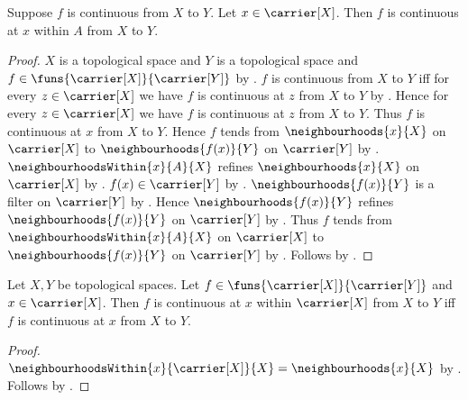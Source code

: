 \begin{theorem}\label{continuous_implies_continuous_at_within}
    Suppose $f$ is continuous from $X$ to $Y$.
    Let $x\in\carrier[X]$.
    Then $f$ is continuous at $x$ within $A$ from $X$ to $Y$.
\end{theorem}
\begin{proof}
    $X$ is a topological space and $Y$ is a topological space and
        $f\in\funs{\carrier[X]}{\carrier[Y]}$ by
        .
    $f$ is continuous from $X$ to $Y$ iff
        for every $z\in\carrier[X]$ we have
        $f$ is continuous at $z$ from $X$ to $Y$ by
        .
    Hence for every $z\in\carrier[X]$ we have
        $f$ is continuous at $z$ from $X$ to $Y$.
    Thus $f$ is continuous at $x$ from $X$ to $Y$.
    Hence $f$ tends from $\neighbourhoods{x}{X}$ on $\carrier[X]$ to
        $\neighbourhoods{f(x)}{Y}$ on $\carrier[Y]$ by
        .
    $\neighbourhoodsWithin{x}{A}{X}$ refines
        $\neighbourhoods{x}{X}$ on $\carrier[X]$ by
        .
    $f(x)\in\carrier[Y]$ by .
    $\neighbourhoods{f(x)}{Y}$ is a filter on $\carrier[Y]$ by
        .
    Hence $\neighbourhoods{f(x)}{Y}$ refines
        $\neighbourhoods{f(x)}{Y}$ on $\carrier[Y]$ by
        .
    Thus $f$ tends from $\neighbourhoodsWithin{x}{A}{X}$ on
        $\carrier[X]$ to $\neighbourhoods{f(x)}{Y}$ on $\carrier[Y]$ by
        .
    Follows by .
\end{proof}

\begin{theorem}\label{continuous_at_within_carrier_iff}
    Let $X,Y$ be topological spaces.
    Let $f\in\funs{\carrier[X]}{\carrier[Y]}$ and
        $x\in\carrier[X]$.
    Then $f$ is continuous at $x$ within $\carrier[X]$ from $X$ to $Y$
        iff $f$ is continuous at $x$ from $X$ to $Y$.
\end{theorem}
\begin{proof}
    $\neighbourhoodsWithin{x}{\carrier[X]}{X}
        =\neighbourhoods{x}{X}$ by .
    Follows by .
\end{proof}

